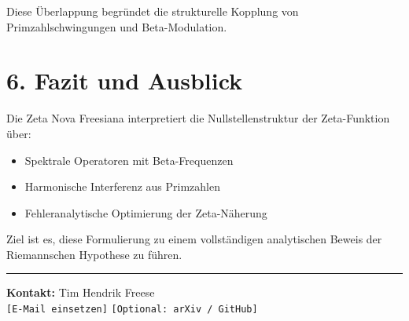 \documentclass[12pt]{article}
\begin{document}
Diese Überlappung begründet die strukturelle Kopplung von Primzahlschwingungen und Beta-Modulation.

\section*{6. Fazit und Ausblick}

Die Zeta Nova Freesiana interpretiert die Nullstellenstruktur der Zeta-Funktion über:

\begin{itemize}
  \item Spektrale Operatoren mit Beta-Frequenzen
  \item Harmonische Interferenz aus Primzahlen
  \item Fehleranalytische Optimierung der Zeta-Näherung
\end{itemize}

Ziel ist es, diese Formulierung zu einem vollständigen analytischen Beweis der Riemannschen Hypothese zu führen.

\vspace{1em}
\hrule
\vspace{1em}

\textbf{Kontakt:} Tim Hendrik Freese \\
\texttt{[E-Mail einsetzen]} \quad \texttt{[Optional: arXiv / GitHub]}
\end{document}
